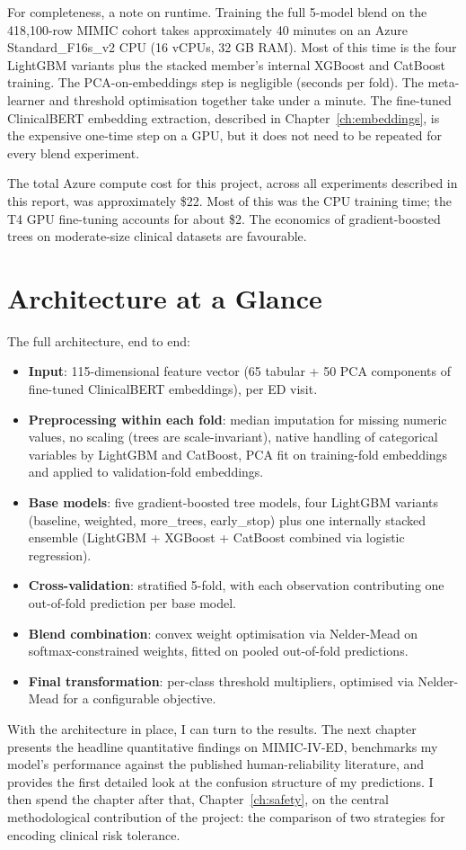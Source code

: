 For completeness, a note on runtime. Training the full 5-model blend on the 418,100-row MIMIC cohort takes approximately 40 minutes on an Azure Standard\_F16s\_v2 CPU (16 vCPUs, 32 GB RAM). Most of this time is the four LightGBM variants plus the stacked member's internal XGBoost and CatBoost training. The PCA-on-embeddings step is negligible (seconds per fold). The meta-learner and threshold optimisation together take under a minute. The fine-tuned ClinicalBERT embedding extraction, described in Chapter~\ref{ch:embeddings}, is the expensive one-time step on a GPU, but it does not need to be repeated for every blend experiment.

The total Azure compute cost for this project, across all experiments described in this report, was approximately \$22. Most of this was the CPU training time; the T4 GPU fine-tuning accounts for about \$2. The economics of gradient-boosted trees on moderate-size clinical datasets are favourable.

\section{Architecture at a Glance}

The full architecture, end to end:

\begin{itemize}
 \item \textbf{Input}: 115-dimensional feature vector (65 tabular + 50 PCA components of fine-tuned ClinicalBERT embeddings), per ED visit.
 \item \textbf{Preprocessing within each fold}: median imputation for missing numeric values, no scaling (trees are scale-invariant), native handling of categorical variables by LightGBM and CatBoost, PCA fit on training-fold embeddings and applied to validation-fold embeddings.
 \item \textbf{Base models}: five gradient-boosted tree models, four LightGBM variants (baseline, weighted, more\_trees, early\_stop) plus one internally stacked ensemble (LightGBM + XGBoost + CatBoost combined via logistic regression).
 \item \textbf{Cross-validation}: stratified 5-fold, with each observation contributing one out-of-fold prediction per base model.
 \item \textbf{Blend combination}: convex weight optimisation via Nelder-Mead on softmax-constrained weights, fitted on pooled out-of-fold predictions.
 \item \textbf{Final transformation}: per-class threshold multipliers, optimised via Nelder-Mead for a configurable objective.
\end{itemize}

With the architecture in place, I can turn to the results. The next chapter presents the headline quantitative findings on MIMIC-IV-ED, benchmarks my model's performance against the published human-reliability literature, and provides the first detailed look at the confusion structure of my predictions. I then spend the chapter after that, Chapter~\ref{ch:safety}, on the central methodological contribution of the project: the comparison of two strategies for encoding clinical risk tolerance.
